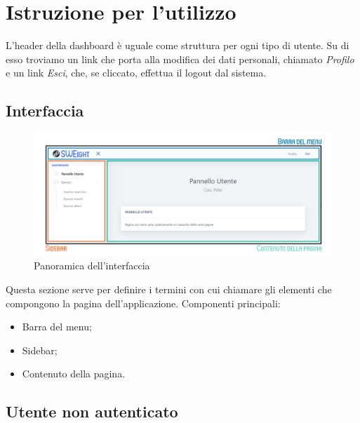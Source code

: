 \section{Istruzione per l'utilizzo}
  L'header della {dashboard} è uguale come struttura per ogni tipo di utente. Su di esso troviamo un link che porta alla modifica dei dati personali, chiamato \textit{Profilo} e un link \textit{Esci}, che, se cliccato, effettua il logout dal sistema.



\subsection{Interfaccia}
    \begin{figure}[H]
        \centering
        \includegraphics[width=17cm]{sez/img/istruzioni/dashboardMod.png} 
        \caption{Panoramica dell'interfaccia}\label{fig:1}
    \end{figure}
  Questa sezione serve per definire i termini con cui chiamare gli elementi che compongono la pagina dell'applicazione.
    Componenti principali:
    \begin{itemize}
        \item Barra del menu;
        \item {Sidebar};
        \item Contenuto della pagina.
    \end{itemize}


\subsection{Utente non autenticato}
